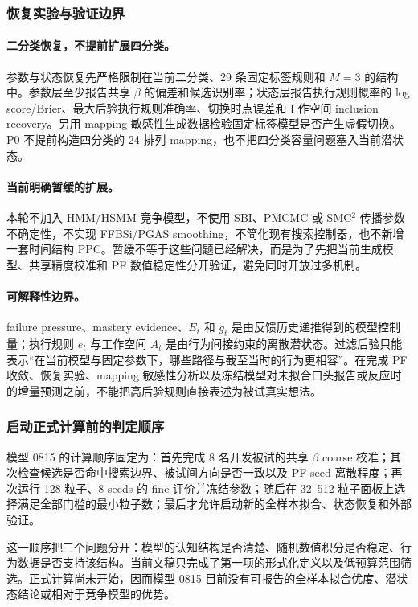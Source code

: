 \subsubsection{恢复实验与验证边界}

\paragraph{二分类恢复，不提前扩展四分类。}
参数与状态恢复先严格限制在当前二分类、29 条固定标签规则和 $M=3$ 的结构中。参数层至少报告共享 $\beta$ 的偏差和候选识别率；状态层报告执行规则概率的 log score/Brier、最大后验执行规则准确率、切换时点误差和工作空间 inclusion recovery。另用 mapping 敏感性生成数据检验固定标签模型是否产生虚假切换。P0 不提前构造四分类的 24 排列 mapping，也不把四分类容量问题塞入当前潜状态。

\paragraph{当前明确暂缓的扩展。}
本轮不加入 HMM/HSMM 竞争模型，不使用 SBI、PMCMC 或 SMC$^2$ 传播参数不确定性，不实现 FFBSi/PGAS smoothing，不简化现有搜索控制器，也不新增一套时间结构 PPC。暂缓不等于这些问题已经解决，而是为了先把当前生成模型、共享精度校准和 PF 数值稳定性分开验证，避免同时开放过多机制。

\paragraph{可解释性边界。}
failure pressure、mastery evidence、$E_t$ 和 $g_t$ 是由反馈历史递推得到的模型控制量；执行规则 $e_t$ 与工作空间 $A_t$ 是由行为间接约束的离散潜状态。过滤后验只能表示“在当前模型与固定参数下，哪些路径与截至当时的行为更相容”。在完成 PF 收敛、恢复实验、mapping 敏感性分析以及冻结模型对未拟合口头报告或反应时的增量预测之前，不能把高后验规则直接表述为被试真实想法。


\subsubsection{启动正式计算前的判定顺序}

模型 0815 的计算顺序固定为：首先完成 8 名开发被试的共享 $\beta$ coarse 校准；其次检查候选是否命中搜索边界、被试间方向是否一致以及 PF seed 离散程度；再次运行 128 粒子、8 seeds 的 fine 评价并冻结参数；随后在 32--512 粒子面板上选择满足全部门槛的最小粒子数；最后才允许启动新的全样本拟合、状态恢复和外部验证。

这一顺序把三个问题分开：模型的认知结构是否清楚、随机数值积分是否稳定、行为数据是否支持该结构。当前文稿只完成了第一项的形式化定义以及低预算范围筛选。正式计算尚未开始，因而模型 0815 目前没有可报告的全样本拟合优度、潜状态结论或相对于竞争模型的优势。


